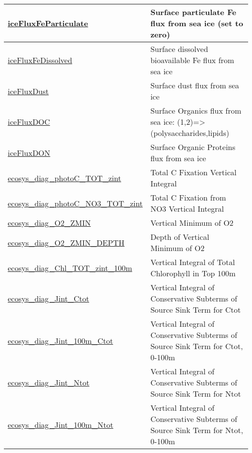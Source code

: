 {\begin{center}
\begin{longtable}{| p{2.0in} | p{4.0in} |}
    \hline
    \hyperref[subsec:var_sec_forcing_iceFluxFeParticulate]{iceFluxFeParticulate} & Surface particulate Fe flux from sea ice (set to zero) \\
    \hline
    \hyperref[subsec:var_sec_forcing_iceFluxFeDissolved]{iceFluxFeDissolved} & Surface dissolved bioavailable Fe flux from sea ice \\
    \hline
    \hyperref[subsec:var_sec_forcing_iceFluxDust]{iceFluxDust} & Surface dust flux from sea ice \\
    \hline
    \hyperref[subsec:var_sec_forcing_iceFluxDOC]{iceFluxDOC} & Surface Organics flux from sea ice: (1,2)=>(polysaccharides,lipids) \\
    \hline
    \hyperref[subsec:var_sec_forcing_iceFluxDON]{iceFluxDON} & Surface Organic Proteins flux from sea ice \\
    \hline
    \hyperref[subsec:var_sec_forcing_ecosys_diag_photoC_TOT_zint]{ecosys\_diag\_photoC\_TOT\_zint} & Total C Fixation Vertical Integral \\
    \hline
    \hyperref[subsec:var_sec_forcing_ecosys_diag_photoC_NO3_TOT_zint]{ecosys\_diag\_photoC\_NO3\_\-TOT\_zint} & Total C Fixation from NO3 Vertical Integral \\
    \hline
    \hyperref[subsec:var_sec_forcing_ecosys_diag_O2_ZMIN]{ecosys\_diag\_O2\_ZMIN} & Vertical Minimum of O2 \\
    \hline
    \hyperref[subsec:var_sec_forcing_ecosys_diag_O2_ZMIN_DEPTH]{ecosys\_diag\_O2\_ZMIN\_\-DEPTH} & Depth of Vertical Minimum of O2 \\
    \hline
    \hyperref[subsec:var_sec_forcing_ecosys_diag_Chl_TOT_zint_100m]{ecosys\_diag\_Chl\_TOT\_zint\_\-100m} & Vertical Integral of Total Chlorophyll in Top 100m \\
    \hline
    \hyperref[subsec:var_sec_forcing_ecosys_diag_Jint_Ctot]{ecosys\_diag\_Jint\_Ctot} & Vertical Integral of Conservative Subterms of Source Sink Term for Ctot \\
    \hline
    \hyperref[subsec:var_sec_forcing_ecosys_diag_Jint_100m_Ctot]{ecosys\_diag\_Jint\_100m\_Ctot} & Vertical Integral of Conservative Subterms of Source Sink Term for Ctot, 0-100m \\
    \hline
    \hyperref[subsec:var_sec_forcing_ecosys_diag_Jint_Ntot]{ecosys\_diag\_Jint\_Ntot} & Vertical Integral of Conservative Subterms of Source Sink Term for Ntot \\
    \hline
    \hyperref[subsec:var_sec_forcing_ecosys_diag_Jint_100m_Ntot]{ecosys\_diag\_Jint\_100m\_Ntot} & Vertical Integral of Conservative Subterms of Source Sink Term for Ntot, 0-100m \\

\end{longtable}
\end{center}}
